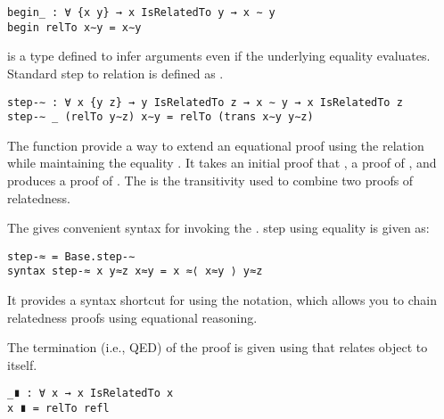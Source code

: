 \begin{verbatim}
begin_ : ∀ {x y} → x IsRelatedTo y → x ∼ y
begin relTo x∼y = x∼y
\end{verbatim}

 is a type defined to infer arguments even if the underlying equality
evaluates. Standard step to relation is defined as .

\begin{verbatim}
step-∼ : ∀ x {y z} → y IsRelatedTo z → x ∼ y → x IsRelatedTo z
step-∼ _ (relTo y∼z) x∼y = relTo (trans x∼y y∼z)
\end{verbatim}

The  function provide a way to extend an equational proof using
the relation  while maintaining the equality .
It takes an initial proof that , a proof  of
, and produces a proof of . The
 is the transitivity used to combine two proofs of relatedness.

The  gives convenient syntax for invoking the .
step using equality is given as:

\begin{verbatim}
step-≈ = Base.step-∼
syntax step-≈ x y≈z x≈y = x ≈⟨ x≈y ⟩ y≈z
\end{verbatim}

It provides a syntax shortcut for using the  notation, which allows
you to chain relatedness proofs using equational reasoning.

The termination (i.e., QED) of the proof is given using  that relates
object to itself.

\begin{verbatim}
_∎ : ∀ x → x IsRelatedTo x
x ∎ = relTo refl
\end{verbatim}

